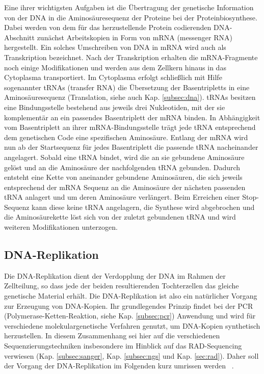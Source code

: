 Eine ihrer wichtigsten Aufgaben ist die Übertragung der genetische Information von der DNA in die Aminosäuresequenz der Proteine bei der Proteinbiosynthese. Dabei werden von dem für das herzustellende Protein codierenden DNA-Abschnitt zunächst Arbeitskopien in Form von mRNA (messenger RNA) hergestellt. Ein solches Umschreiben von DNA in mRNA wird auch als Transkription bezeichnet. Nach der Transkription erhalten die mRNA-Fragmente noch einige Modifikationen und werden aus dem Zellkern hinaus in das Cytoplasma transportiert. Im Cytoplasma erfolgt schließlich mit Hilfe sogenannter tRNAs (transfer RNA) die Übersetzung der Basentripletts in eine Aminosäuresequenz (Translation, siehe auch Kap. \ref{subsec:dna}). tRNAs besitzen eine Bindungsstelle bestehend aus jeweils drei Nukleotiden, mit der sie komplementär an ein passendes Basentriplett der mRNA binden. In Abhängigkeit vom Basentriplett an ihrer mRNA-Bindungsstelle trägt jede tRNA entsprechend dem genetischen Code eine spezifischen Aminosäure. Entlang der mRNA wird nun ab der Startsequenz für jedes Basentriplett die passende tRNA nacheinander angelagert. Sobald eine tRNA bindet, wird die an sie gebundene Aminosäure gelöst und an die Aminosäure der nachfolgenden tRNA gebunden. Dadurch entsteht eine Kette von aneinander gebundene Aminosäuren, die sich jeweils entsprechend der mRNA Sequenz an die Aminosäure der nächsten passenden tRNA anlagert und um deren Aminosäure verlängert. Beim Erreichen einer Stop-Sequenz kann diese keine tRNA angelagern, die Synthese wird abgebrochen und die Aminosäurekette löst sich von der zuletzt gebundenen tRNA und wird weiteren Modifikationen unterzogen. 


\subsection{DNA-Replikation} \label{subsec:replication}

Die DNA-Replikation dient der Verdopplung der DNA im Rahmen der Zellteilung, so dass jede der beiden resultierenden Tochterzellen das gleiche genetische Material erhält. Die DNA-Replikation ist also ein natürlicher Vorgang zur Erzeugung von DNA-Kopien. Ihr grundlegendes Prinzip findet bei der PCR (Polymerase-Ketten-Reaktion, siehe Kap. \ref{subsec:pcr}) Anwendung und wird für verschiedene molekulargenetische Verfahren genutzt, um DNA-Kopien synthetisch herzustellen. In diesem Zusammenhang sei hier auf die verschiedenen Sequenzierungstechniken insbesondere im Hinblick auf das RAD-Sequencing verwiesen (Kap. \ref{subsec:sanger}, Kap. \ref{subsec:ngs} und Kap. \ref{sec:rad}). Daher soll der Vorgang der DNA-Replikation im Folgenden kurz umrissen werden ~\cite{odonell_2013, chargin_2010, prioleau_2016}. \\

